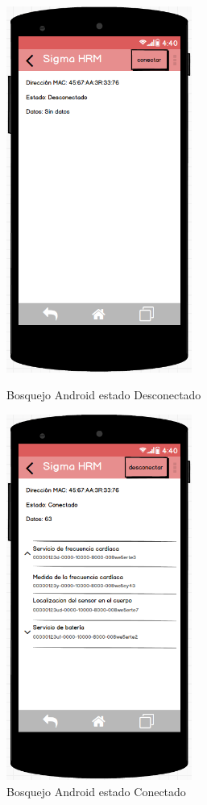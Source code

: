 \begin{figure}[h] \centering
	\begin{minipage}{0.45\textwidth}\centering
		\includegraphics[height=12cm]{graphs/mockup_android_device_es.png} \caption{Bosquejo Android estado Desconectado}\label{fig:mockup:desconectado}
	\end{minipage}\hfill
	\begin{minipage}{0.45\textwidth}\centering
		\includegraphics[height=12cm]{graphs/mockup_android_emitiendo_es.png} \caption{Bosquejo Android estado Conectado}\label{fig:mockup:conectado}
	\end{minipage}
\end{figure}

